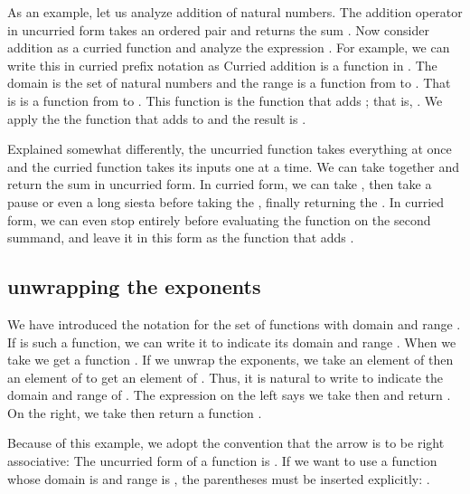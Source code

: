\begin{example}[addition]
As an example, let us analyze addition of natural numbers.  The addition operator in uncurried form takes an ordered pair  and
returns the sum .   Now consider addition as a curried function and analyze the expression .  For example, we can write this in curried prefix notation as
Curried addition is a function in .  The domain
is the set of natural numbers and the range is a function from  to .
That is  is a function from  to .  This function is the function that adds ; that is, .  We apply the
the function that adds  to  and the result is .
\end{example}

Explained somewhat differently, the uncurried function takes everything at once and the curried function takes its inputs one at a time.  We can take  together and return the sum  in uncurried form.  In curried form, we can take , then take a pause or even a long siesta before taking the , finally returning the .  In curried form, we can even stop entirely before evaluating the function  on the second summand, and leave it in this form as the function that adds .

\subsection{unwrapping the exponents}

We have introduced the notation  for the set of functions with domain  and range .    If  is such a function, we can write it
 to indicate its domain  and range .  When we take
 we get a function .  If we unwrap the exponents, we
take an element of  then an element of  to get an element of .
Thus, it is natural to write
to indicate the domain and range of .  The expression on the left
says we take  then  and return .  On the
right, we take  then return a function .

Because of this example, we adopt the convention that the arrow \mc{$\to$}
is to be right associative:
The uncurried form of a function  is .
If we want to use a function  whose domain is  and range is ,
the parentheses must be inserted explicitly: .

